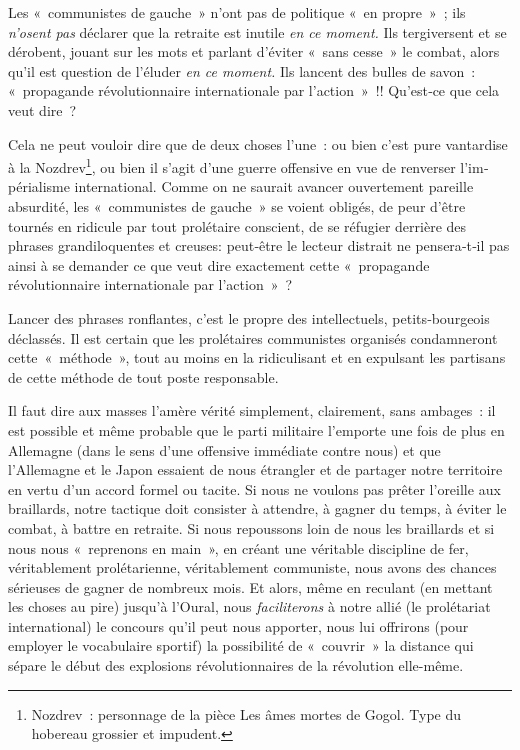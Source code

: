 \documentclass[french,twoside]{book} %
\begin{document}
Les « communistes de gauche » n’ont pas de politique « en propre » ; ils \emph{n’osent pas} déclarer que la retraite est inutile \emph{en ce moment.} Ils tergiversent et se dérobent, jouant sur les mots et parlant d’éviter « sans cesse » le combat, alors qu’il est question de l’éluder \emph{en ce moment.} Ils lan­cent des bulles de savon : « propagande révolutionnaire internationale par l’action » !! Qu'est‑ce que cela veut dire ?\par
Cela ne peut vouloir dire que de deux choses l’une : ou bien c’est pure vantardise à la Nozdrev\footnote{Nozdrev : personnage de la pièce Les âmes mortes de Gogol. Type du hobereau grossier et impudent.}, ou bien il s’agit d’une guerre offensive en vue de renverser l’im­périalisme international. Comme on ne saurait avancer ouvertement pareille absurdité, les « communistes de gau­che » se voient obligés, de peur d’être tournés en ridicule par tout prolétaire conscient, de se réfugier derrière des phrases grandiloquentes et creuses: peut‑être le lecteur distrait ne pensera‑t‑il pas ainsi à se demander ce que veut dire exactement cette « propagande révolutionnaire internationale par l’action » ?\par
\bigbreak
\noindent Lancer des phrases ronflantes, c’est le propre des intellectuels, petits‑bourgeois déclassés. Il est certain que les prolétaires communistes organisés condamneront cette « méthode », tout au moins en la ridiculisant et en expulsant les partisans de cette méthode de tout poste responsable.\par
Il faut dire aux masses l’amère vérité simplement, clairement, sans ambages : il est possible et même probable que le parti militaire l’emporte une fois de plus en Allemagne (dans le sens d’une offensive immédiate contre nous) et que l’Allemagne et le Japon essaient de nous étrangler et de partager notre territoire en vertu d’un accord formel ou tacite. Si nous ne voulons pas prêter l’oreille aux braillards, notre tactique doit consister à attendre, à gagner du temps, à éviter le combat, à battre en retraite. Si nous repoussons loin de nous les braillards et si nous nous « reprenons en main », en créant une véritable discipline de fer, véritablement prolétarienne, véritablement communiste, nous avons des chances sérieuses de gagner de nombreux mois. Et alors, même en reculant (en mettant les choses au pire) jusqu’à l’Oural, nous \emph{faciliterons} à notre allié (le prolétariat international) le concours qu’il peut nous apporter, nous lui offrirons (pour employer le vocabulaire sportif) la possibilité de « couvrir » la distance qui sépare le début des explosions révolutionnaires de la révolution elle-même.\par
\end{document}
